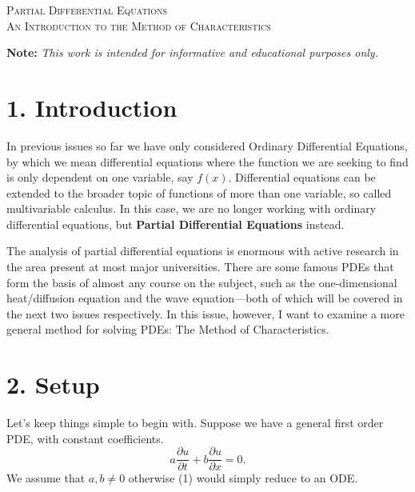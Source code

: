 \documentclass[11pt]{article}
\begin{document}

\begin{tcolorbox}
\begin{center}
    \large
    \textsc{Partial Differential Equations \\ An Introduction to the Method of Characteristics}
\end{center}
\end{tcolorbox}

\begin{center}
\textbf{Note:} \textit{This work is intended for informative and educational purposes only.}
\end{center}

\section*{1. Introduction}
In previous issues so far we have only considered Ordinary Differential Equations, by which we mean differential equations where the function we are seeking to find is only dependent on one variable, say $f(x)$. Differential equations can be extended to the broader topic of functions of more than one variable, so called multivariable calculus. In this case, we are no longer working with ordinary differential equations, but \textbf{Partial Differential Equations} instead. 

The analysis of partial differential equations is enormous with active research in the area present at most major universities. There are some famous PDEs that form the basis of almost any course on the subject, such as the one-dimensional heat/diffusion equation and the wave equation––both of which will be covered in the next two issues respectively. In this issue, however, I want to examine a more general method for solving PDEs: The Method of Characteristics.

\section*{2. Setup}
Let's keep things simple to begin with. Suppose we have a general first order PDE, with constant coefficients.
\begin{equation}
    a \frac{\partial u}{\partial t} + b \frac{\partial u}{\partial x} = 0.
\end{equation}
We assume that $a,b \neq 0$ otherwise (1) would simply reduce to an ODE. 
\end{document}
